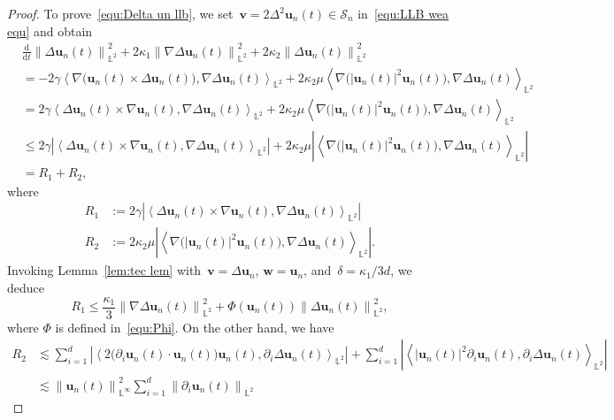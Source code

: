 \documentclass[11pt,reqno]{amsart}
\theoremstyle{definition}
\numberwithin{equation}{section}
\newcommand{\bff}{\boldsymbol}
\newcommand{\bb}{\mathbb}
\newcommand{\ddt}{\frac{\mathrm{d}}{\mathrm{d}t}}
\newcommand{\pa}{\partial}
\newcommand{\nn}{\nonumber}
\newcommand{\norm}[2]{\left\|{#1}\right\|_{#2}}
\newcommand{\inpro}[2]{\left\langle#1,#2\right\rangle}
\begin{document}
\begin{proof}
To prove~\eqref{equ:Delta un llb}, we
set~$\bff{v}=2\Delta^2\bff{u}_n(t)\in\mathcal{S}_n$
in~\eqref{equ:LLB wea equ} and obtain
\begin{align}\label{equ:ddt Lap une}
	&\ddt\norm{\Delta\bff{u}_n(t)}{\bb{L}^2}^2
	+
	2\kappa_1\norm{\nabla\Delta\bff{u}_n(t)}{\bb{L}^2}^2
	+
	2\kappa_2 \norm{\Delta \bff{u}_n(t)}{\bb{L}^2}^2
	\nn\\
	&=
	-2\gamma
	\inpro{\nabla\Big(\bff{u}_n(t)\times\Delta\bff{u}_n(t)\Big)}
	{\nabla\Delta\bff{u}_n(t)}_{\bb{L}^2}
	+2\kappa_2\mu
	\inpro{\nabla\Big(|\bff{u}_n(t)|^2\bff{u}_n(t)\Big)}
	{\nabla\Delta\bff{u}_n(t)}_{\bb{L}^2}
	\nn\\
	&=
	2\gamma
	\inpro{\Delta\bff{u}_n(t)\times\nabla\bff{u}_n(t)}
	{\nabla\Delta\bff{u}_n(t)}_{\bb{L}^2}
	+2\kappa_2\mu
	\inpro{\nabla\Big(|\bff{u}_n(t)|^2\bff{u}_n(t)\Big)}
	{\nabla\Delta\bff{u}_n(t)}_{\bb{L}^2}
	\nn\\
	&\le
	2\gamma
	\left|
	\inpro{\Delta\bff{u}_n(t)\times\nabla\bff{u}_n(t)}
	{\nabla\Delta\bff{u}_n(t)}_{\bb{L}^2}
	\right|
	+ 2\kappa_2\mu
	\left|
	\inpro{\nabla\Big(|\bff{u}_n(t)|^2\bff{u}_n(t)\Big)}
	{\nabla\Delta\bff{u}_n(t)}_{\bb{L}^2}
	\right|
	\nn\\
	&=
	R_1 + R_2,
\end{align}
where
\begin{align*}%
	R_1 &:=
	2\gamma
	\left|
	\inpro{\Delta\bff{u}_n(t)\times\nabla\bff{u}_n(t)}
	{\nabla\Delta\bff{u}_n(t)}_{\bb{L}^2}
	\right|
	\nn\\
	R_2 &:=
	2\kappa_2\mu
	\left|
	\inpro{\nabla\Big(|\bff{u}_n(t)|^2\bff{u}_n(t)\Big)}
	{\nabla\Delta\bff{u}_n(t)}_{\bb{L}^2}
	\right|.
\end{align*}
Invoking Lemma~\ref{lem:tec lem} with~$\bff{v}=\Delta\bff{u}_n$,
$\bff{w}=\bff{u}_n$, and~$\delta=\kappa_1/3d$, we deduce
\[
R_1
\le
\frac{\kappa_1}{3}
\norm{\nabla\Delta\bff{u}_n(t)}{\bb{L}^2}^2
+
\Phi(\bff{u}_n(t))
\norm{\Delta\bff{u}_n(t)}{\bb{L}^2}^2,
\]
where $\Phi$ is defined in~\eqref{equ:Phi}.
On the other hand, we have
\begin{align*}%
	\nn
	R_2 
	&\lesssim
	\sum_{i=1}^d
	\left|
	\inpro{2\Big(\pa_i\bff{u}_n(t)\cdot\bff{u}_n(t)\Big)\bff{u}_n(t)}
	{\pa_i\Delta\bff{u}_n(t)}_{\bb{L}^2}
	\right|
	+
	\sum_{i=1}^d
	\left|
	\inpro{|\bff{u}_n(t)|^2\pa_i\bff{u}_n(t)}
	{\pa_i\Delta\bff{u}_n(t)}_{\bb{L}^2}
	\right|
	\\
	\nn
	&\lesssim
	\norm{\bff{u}_n(t)}{\bb{L}^\infty}^2
	\sum_{i=1}^d
	\norm{\pa_i\bff{u}_n(t)}{\bb{L}^2}

\end{align*}
\end{proof}
\end{document}

